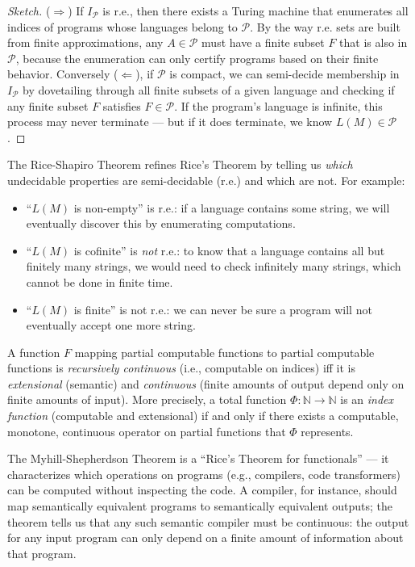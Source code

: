 \begin{proof}[Sketch]
($\Rightarrow$) If $I_\mathcal{P}$ is r.e., then there exists a Turing machine that enumerates all indices of programs whose languages belong to $\mathcal{P}$. By the way r.e. sets are built from finite approximations, any $A \in \mathcal{P}$ must have a finite subset $F$ that is also in $\mathcal{P}$, because the enumeration can only certify programs based on their finite behavior. Conversely ($\Leftarrow$), if $\mathcal{P}$ is compact, we can semi-decide membership in $I_\mathcal{P}$ by dovetailing through all finite subsets of a given language and checking if any finite subset $F$ satisfies $F \in \mathcal{P}$. If the program's language is infinite, this process may never terminate --- but if it does terminate, we know $L(M) \in \mathcal{P}$.
\end{proof}

The Rice-Shapiro Theorem refines Rice's Theorem by telling us \emph{which} undecidable properties are semi-decidable (r.e.) and which are not. For example:

\begin{itemize}
\item ``$L(M)$ is non-empty'' is r.e.: if a language contains some string, we will eventually discover this by enumerating computations.
\item ``$L(M)$ is cofinite'' is \emph{not} r.e.: to know that a language contains all but finitely many strings, we would need to check infinitely many strings, which cannot be done in finite time.
\item ``$L(M)$ is finite'' is not r.e.: we can never be sure a program will not eventually accept one more string.
\end{itemize}

\begin{theorem}
A function $F$ mapping partial computable functions to partial computable functions is \emph{recursively continuous} (i.e., computable on indices) iff it is \emph{extensional} (semantic) and \emph{continuous} (finite amounts of output depend only on finite amounts of input). More precisely, a total function $\Phi: \mathbb{N} \to \mathbb{N}$ is an \emph{index function} (computable and extensional) if and only if there exists a computable, monotone, continuous operator on partial functions that $\Phi$ represents.
\end{theorem}

The Myhill-Shepherdson Theorem is a ``Rice's Theorem for functionals'' --- it characterizes which operations on programs (e.g., compilers, code transformers) can be computed without inspecting the code. A compiler, for instance, should map semantically equivalent programs to semantically equivalent outputs; the theorem tells us that any such semantic compiler must be continuous: the output for any input program can only depend on a finite amount of information about that program.


